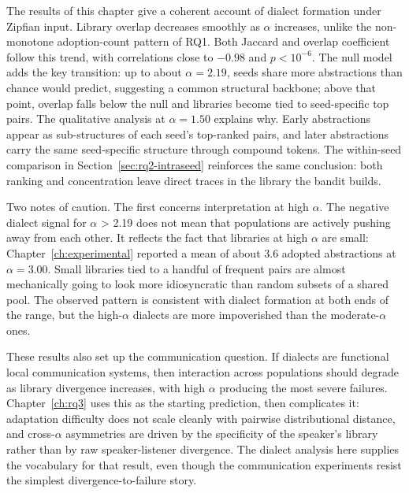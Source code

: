 The results of this chapter give a coherent account of dialect formation under Zipfian input. Library overlap decreases smoothly as $\alpha$ increases, unlike the non-monotone adoption-count pattern of RQ1. Both Jaccard and overlap coefficient follow this trend, with correlations close to $-0.98$ and $p < 10^{-6}$. The null model adds the key transition: up to about $\alpha = 2.19$, seeds share more abstractions than chance would predict, suggesting a common structural backbone; above that point, overlap falls below the null and libraries become tied to seed-specific top pairs. The qualitative analysis at $\alpha = 1.50$ explains why. Early abstractions appear as sub-structures of each seed's top-ranked pairs, and later abstractions carry the same seed-specific structure through compound tokens. The within-seed comparison in Section~\ref{sec:rq2-intraseed} reinforces the same conclusion: both ranking and concentration leave direct traces in the library the bandit builds.

Two notes of caution. The first concerns interpretation at high $\alpha$. The negative dialect signal for $\alpha$ > 2.19 does not mean that populations are actively pushing away from each other. It reflects the fact that libraries at high $\alpha$ are small: Chapter~\ref{ch:experimental} reported a mean of about 3.6 adopted abstractions at $\alpha = 3.00$. Small libraries tied to a handful of frequent pairs are almost mechanically going to look more idiosyncratic than random subsets of a shared pool. The observed pattern is consistent with dialect formation at both ends of the range, but the high-$\alpha$ dialects are more impoverished than the moderate-$\alpha$ ones.

These results also set up the communication question. If dialects are functional local communication systems, then interaction across populations should degrade as library divergence increases, with high $\alpha$ producing the most severe failures. Chapter~\ref{ch:rq3} uses this as the starting prediction, then complicates it: adaptation difficulty does not scale cleanly with pairwise distributional distance, and cross-$\alpha$ asymmetries are driven by the specificity of the speaker's library rather than by raw speaker-listener divergence. The dialect analysis here supplies the vocabulary for that result, even though the communication experiments resist the simplest divergence-to-failure story.